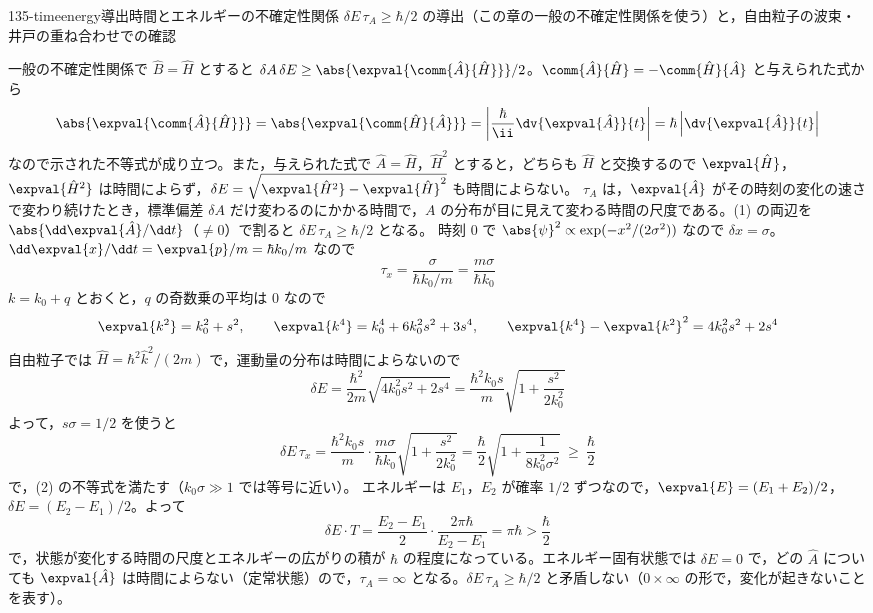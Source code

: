 \documentclass[uplatex,dvipdfmx,a4paper,11pt]{jsarticle}
\begin{document}
\begin{mondai}{135-timeenergy}{導出}{時間とエネルギーの不確定性関係 $\delta E\,\tau_{A}\ge\hbar/2$ の導出（この章の一般の不確定性関係を使う）と，自由粒子の波束・井戸の重ね合わせでの確認}
\begin{tadashii}
\keisan
{} 一般の不確定性関係で $\hat{B}=\hat{H}$ とすると $\delta A\,\delta E\ge\abs{\expval{\comm{\hat{A}}{\hat{H}}}}/2$。$\comm{\hat{A}}{\hat{H}}=-\comm{\hat{H}}{\hat{A}}$ と与えられた式から
\[ \abs{\expval{\comm{\hat{A}}{\hat{H}}}}=\abs{\expval{\comm{\hat{H}}{\hat{A}}}}=\left|\frac{\hbar}{\ii}\dv{\expval{\hat{A}}}{t}\right|=\hbar\left|\dv{\expval{\hat{A}}}{t}\right| \]
なので示された不等式が成り立つ。また，与えられた式で $\hat{A}=\hat{H}$，$\hat{H}^{2}$ とすると，どちらも $\hat{H}$ と交換するので $\expval{\hat{H}}$，$\expval{\hat{H}^{2}}$ は時間によらず，$\delta E=\sqrt{\expval{\hat{H}^{2}}-\expval{\hat{H}}^{2}}$ も時間によらない。
 $\tau_{A}$ は，$\expval{\hat{A}}$ がその時刻の変化の速さで変わり続けたとき，標準偏差 $\delta A$ だけ変わるのにかかる時間で，$A$ の分布が目に見えて変わる時間の尺度である。(1) の両辺を $\abs{\dd\expval{\hat{A}}/\dd t}$（$\neq0$）で割ると $\delta E\,\tau_{A}\ge\hbar/2$ となる。
 時刻 $0$ で $\abs{\psi}^{2}\propto\exp(-x^{2}/(2\sigma^{2}))$ なので $\delta x=\sigma$。$\dd\expval{x}/\dd t=\expval{p}/m=\hbar k_{0}/m$ なので
\[ \tau_{x}=\frac{\sigma}{\hbar k_{0}/m}=\frac{m\sigma}{\hbar k_{0}} \]
$k=k_{0}+q$ とおくと，$q$ の奇数乗の平均は $0$ なので
\[ \expval{k^{2}}=k_{0}^{2}+s^{2},\qquad \expval{k^{4}}=k_{0}^{4}+6k_{0}^{2}s^{2}+3s^{4},\qquad \expval{k^{4}}-\expval{k^{2}}^{2}=4k_{0}^{2}s^{2}+2s^{4} \]
自由粒子では $\hat{H}=\hbar^{2}\hat{k}^{2}/(2m)$ で，運動量の分布は時間によらないので
\[ \delta E=\frac{\hbar^{2}}{2m}\sqrt{4k_{0}^{2}s^{2}+2s^{4}}=\frac{\hbar^{2}k_{0}s}{m}\sqrt{1+\frac{s^{2}}{2k_{0}^{2}}} \]
よって，$s\sigma=1/2$ を使うと
\[ \delta E\,\tau_{x}=\frac{\hbar^{2}k_{0}s}{m}\cdot\frac{m\sigma}{\hbar k_{0}}\sqrt{1+\frac{s^{2}}{2k_{0}^{2}}}=\frac{\hbar}{2}\sqrt{1+\frac{1}{8k_{0}^{2}\sigma^{2}}}\ \ge\ \frac{\hbar}{2} \]
で，(2) の不等式を満たす（$k_{0}\sigma\gg1$ では等号に近い）。
 エネルギーは $E_{1}$，$E_{2}$ が確率 $1/2$ ずつなので，$\expval{E}=(E_{1}+E_{2})/2$，$\delta E=(E_{2}-E_{1})/2$。よって
\[ \delta E\cdot T=\frac{E_{2}-E_{1}}{2}\cdot\frac{2\pi\hbar}{E_{2}-E_{1}}=\pi\hbar>\frac{\hbar}{2} \]
で，状態が変化する時間の尺度とエネルギーの広がりの積が $\hbar$ の程度になっている。エネルギー固有状態では $\delta E=0$ で，どの $\hat{A}$ についても $\expval{\hat{A}}$ は時間によらない（定常状態）ので，$\tau_{A}=\infty$ となる。$\delta E\,\tau_{A}\ge\hbar/2$ と矛盾しない（$0\times\infty$ の形で，変化が起きないことを表す）。

\end{tadashii}
\end{mondai}
\end{document}
